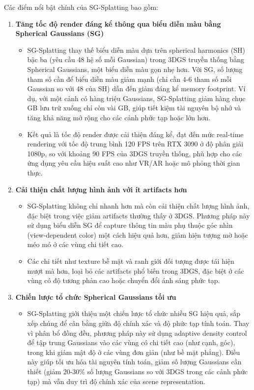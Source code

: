 Các điểm nổi bật chính của SG-Splatting bao gồm:
\begin{enumerate}
    \item \textbf{Tăng tốc độ render đáng kể thông qua biểu diễn màu bằng Spherical Gaussians (SG)}
    \begin{itemize}
        \item SG-Splatting thay thế biểu diễn màu dựa trên spherical harmonics (SH) bậc ba (yêu cầu 48 hệ số mỗi Gaussian) trong 3DGS truyền thống bằng Spherical Gaussians, một biểu diễn màu gọn nhẹ hơn. Với SG, số lượng tham số cần để biểu diễn màu giảm mạnh (chỉ cần 4-6 tham số mỗi Gaussian so với 48 của SH) dẫn đến giảm đáng kể memory footprint. Ví dụ, với một cảnh có hàng triệu Gaussians, SG-Splatting giảm hàng chục GB lưu trữ xuống chỉ còn vài GB, giúp tiết kiệm tài nguyên bộ nhớ và tăng khả năng mở rộng cho các cảnh phức tạp hoặc lớn hơn.
        \item Kết quả là tốc độ render được cải thiện đáng kể, đạt đến mức real-time rendering với tốc độ trung bình 120 FPS trên RTX 3090 ở độ phân giải 1080p, so với khoảng 90 FPS của 3DGS truyền thống, phù hợp cho các ứng dụng yêu cầu hiệu suất cao như VR/AR hoặc mô phỏng thời gian thực.
    \end{itemize}
    \item \textbf{Cải thiện chất lượng hình ảnh với ít artifacts hơn}
    \begin{itemize}
        \item SG-Splatting không chỉ nhanh hơn mà còn cải thiện chất lượng hình ảnh, đặc biệt trong việc giảm artifacts thường thấy ở 3DGS. Phương pháp này sử dụng biểu diễn SG để capture thông tin màu phụ thuộc góc nhìn (view-dependent color) một cách hiệu quả hơn, giảm hiện tượng mờ hoặc méo mó ở các vùng chi tiết cao.
        \item Các chi tiết như texture bề mặt và ranh giới đối tượng được tái hiện mượt mà hơn, loại bỏ các artifacts phổ biến trong 3DGS, đặc biệt ở các vùng có độ tương phản cao hoặc chuyển đổi ánh sáng phức tạp.
    \end{itemize}
    \item \textbf{Chiến lược tổ chức Spherical Gaussians tối ưu}
    \begin{itemize}
        \item SG-Splatting giới thiệu một chiến lược tổ chức nhiều SG hiệu quả, sắp xếp chúng để cân bằng giữa độ chính xác và độ phức tạp tính toán. Thay vì phân bổ đồng đều, phương pháp này sử dụng adaptive density control để tập trung Gaussians vào các vùng có chi tiết cao (như cạnh, góc), trong khi giảm mật độ ở các vùng đơn giản (như bề mặt phẳng). Điều này giúp tối ưu hóa tài nguyên tính toán, giảm số lượng Gaussians cần thiết (giảm 20-30\% số lượng Gaussians so với 3DGS trong các cảnh phức tạp) mà vẫn duy trì độ chính xác của scene representation.

\end{itemize}
\end{enumerate}
